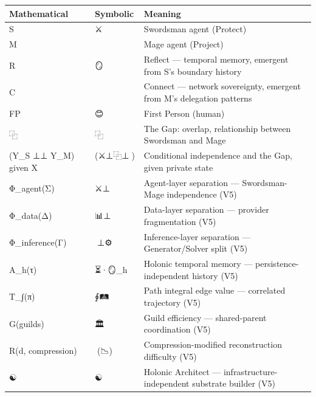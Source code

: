 \documentclass[
  11pt,
]{article}
\newcounter{none} %
\begin{document}
{\def\LTcaptype{none} %
\begin{longtable}[]{@{}
  >{\raggedright\arraybackslash}p{}
  >{\raggedright\arraybackslash}p{}
  >{\raggedright\arraybackslash}p{}@{}}
\toprule\noalign{}
\begin{minipage}[b]{\linewidth}\raggedright
Mathematical
\end{minipage} & \begin{minipage}[b]{\linewidth}\raggedright
Symbolic
\end{minipage} & \begin{minipage}[b]{\linewidth}\raggedright
Meaning
\end{minipage} \\
\midrule\noalign{}
\endhead
\bottomrule\noalign{}
\endlastfoot
S & ⚔️ & Swordsman agent (Protect) \\
M & 🧙 & Mage agent (Project) \\
R & 🪞 & Reflect --- temporal memory, emergent from S's boundary
history \\
C & 🤝 & Connect --- network sovereignty, emergent from M's delegation
patterns \\
FP & 😊 & First Person (human) \\
⿻ & ⿻ & The Gap: overlap, relationship between Swordsman and Mage \\
(Y\_S ⊥⊥ Y\_M) given X & (⚔️⊥⿻⊥🧙)🙂 & Conditional independence and the
Gap, given private state \\
Φ\_agent(Σ) & ⚔️⊥🧙 & Agent-layer separation --- Swordsman-Mage
independence (V5) \\
Φ\_data(Δ) & 📊⊥🔮 & Data-layer separation --- provider fragmentation
(V5) \\
Φ\_inference(Γ) & 🧠⊥⚙️ & Inference-layer separation ---
Generator/Solver split (V5) \\
A\_h(τ) & ⏳·🪞\_h & Holonic temporal memory --- persistence-independent
history (V5) \\
T\_∫(π) & ∮🛤️ & Path integral edge value --- correlated trajectory
(V5) \\
G(guilds) & 🏛️ & Guild efficiency --- shared-parent coordination (V5) \\
R(d, compression) & 🎯(📉) & Compression-modified reconstruction
difficulty (V5) \\
☯️🔷 & ☯️🔷 & Holonic Architect --- infrastructure-independent substrate
builder (V5) \\

\end{longtable}}
\end{document}
